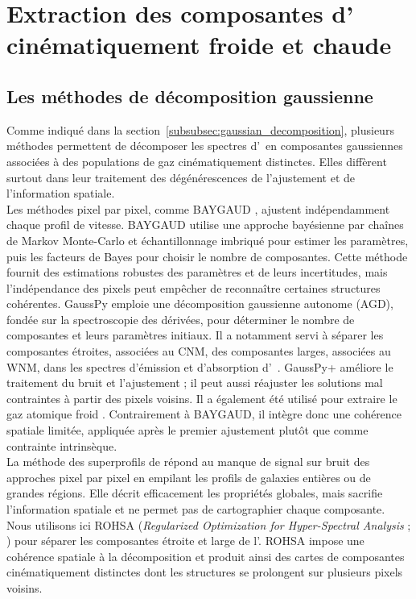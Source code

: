 \section[Extraction des composantes d'\HI\ cinématiquement froide et chaude]{Extraction des composantes d'\HI\\cinématiquement froide et chaude}
\label{sec:ROHSA}
\subsection{Les méthodes de décomposition gaussienne}

Comme indiqué dans la section~\ref{subsubsec:gaussian_decomposition}, plusieurs méthodes permettent de décomposer les spectres d'\HI\ en composantes gaussiennes associées à des populations de gaz cinématiquement distinctes. Elles diffèrent surtout dans leur traitement des dégénérescences de l'ajustement et de l'information spatiale.\\\indent
Les méthodes pixel par pixel, comme BAYGAUD \citep{Oh2019}, ajustent indépendamment chaque profil de vitesse. BAYGAUD utilise une approche bayésienne par chaînes de Markov Monte-Carlo et échantillonnage imbriqué pour estimer les paramètres, puis les facteurs de Bayes pour choisir le nombre de composantes. Cette méthode fournit des estimations robustes des paramètres et de leurs incertitudes, mais l'indépendance des pixels peut empêcher de reconnaître certaines structures cohérentes. GaussPy \citep{Lindner2015} emploie une décomposition gaussienne autonome (AGD), fondée sur la spectroscopie des dérivées, pour déterminer le nombre de composantes et leurs paramètres initiaux. Il a notamment servi à séparer les composantes étroites, associées au CNM, des composantes larges, associées au WNM, dans les spectres d'émission et d'absorption d'\HI\ \citep{Murray2017, Murray2018}. GaussPy+ \citep{Riener2019} améliore le traitement du bruit et l'ajustement ; il peut aussi réajuster les solutions mal contraintes à partir des pixels voisins. Il a également été utilisé pour extraire le gaz atomique froid \citep{Syed2023}. Contrairement à BAYGAUD, il intègre donc une cohérence spatiale limitée, appliquée après le premier ajustement plutôt que comme contrainte intrinsèque.\\\indent
La méthode des superprofils de \citet{Ianjamasimanana2012} répond au manque de signal sur bruit des approches pixel par pixel en empilant les profils de galaxies entières ou de grandes régions. Elle décrit efficacement les propriétés globales, mais sacrifie l'information spatiale et ne permet pas de cartographier chaque composante.\\\indent
Nous utilisons ici ROHSA (\textit{Regularized Optimization for Hyper-Spectral Analysis} ; \citealt{Marchal2019}) pour séparer les composantes étroite et large de l'\HI. ROHSA impose une cohérence spatiale à la décomposition et produit ainsi des cartes de composantes cinématiquement distinctes dont les structures se prolongent sur plusieurs pixels voisins.

